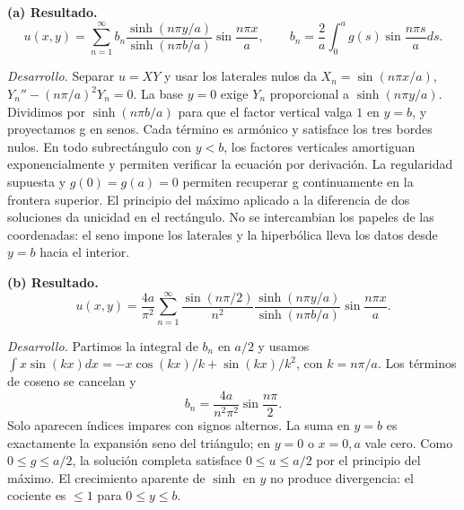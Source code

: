 \noindent\textbf{(a) Resultado.} \[u(x,y)=\sum_{n=1}^{\infty}b_n\frac{\sinh(n\pi y/a)}{\sinh(n\pi b/a)}\sin\frac{n\pi x}{a},\qquad
b_n=\frac2a\int_0^a g(s)\sin\frac{n\pi s}{a}ds.\]

\noindent\textit{Desarrollo.} Separar \(u=XY\) y usar los laterales nulos da \(X_n=\sin(n\pi x/a)\),
\(Y_n''-(n\pi/a)^2Y_n=0\). La base \(y=0\) exige \(Y_n\) proporcional a \(\sinh(n\pi y/a)\).
Dividimos por \(\sinh(n\pi b/a)\) para que el factor vertical valga \(1\) en \(y=b\), y proyectamos g en senos.
Cada término es armónico y satisface los tres bordes nulos. En todo subrectángulo con \(y<b\),
los factores verticales amortiguan exponencialmente y permiten verificar la ecuación por derivación.
La regularidad supuesta y \(g(0)=g(a)=0\) permiten recuperar g continuamente en la frontera superior.
El principio del máximo aplicado a la diferencia de dos soluciones da unicidad en el rectángulo.
No se intercambian los papeles de las coordenadas: el seno impone los laterales y la hiperbólica
lleva los datos desde \(y=b\) hacia el interior.

\medskip

\noindent\textbf{(b) Resultado.} \[u(x,y)=\frac{4a}{\pi^2}\sum_{n=1}^{\infty}\frac{\sin(n\pi/2)}{n^2}
\frac{\sinh(n\pi y/a)}{\sinh(n\pi b/a)}\sin\frac{n\pi x}{a}.\]

\noindent\textit{Desarrollo.} Partimos la integral de \(b_n\) en \(a/2\) y usamos
\(\int x\sin(kx)dx=-x\cos(kx)/k+\sin(kx)/k^2\), con \(k=n\pi/a\).
Los términos de coseno se cancelan y
\[b_n=\frac{4a}{n^2\pi^2}\sin\frac{n\pi}{2}.\]
Solo aparecen índices impares con signos alternos. La suma en \(y=b\) es exactamente
la expansión seno del triángulo; en \(y=0\) o \(x=0,a\) vale cero. Como \(0\le g\le a/2\),
la solución completa satisface \(0\le u\le a/2\) por el principio del máximo. El crecimiento aparente
de \(\sinh\) en \(y\) no produce divergencia: el cociente es \(\le1\) para \(0\le y\le b\).

